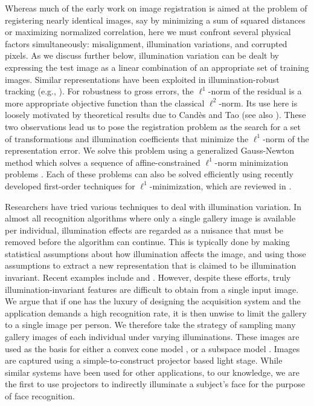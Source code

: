 \documentclass[10pt,journal,letterpaper,compsoc]{IEEEtran} %
\begin{document}
Whereas much of the early work on image registration is aimed at the
problem of registering nearly identical images, say by minimizing a sum of
squared distances or maximizing normalized correlation, here we must confront several physical factors
simultaneously: misalignment, illumination variations, and corrupted pixels.
As we discuss further below, illumination variation can be dealt by
expressing the test image as a linear combination of an appropriate set of
training images. Similar representations have been exploited in
illumination-robust tracking (e.g., \cite{Belhumeur1999-PAA,Murase1995-IJCV}).
For robustness to gross errors, the $\ell^1$-norm of the residual is a more
appropriate objective function than the classical $\ell^2$-norm. Its use here
is loosely motivated by theoretical results due to Cand\`{e}s and Tao
\cite{CandesE2005-IT} (see also \cite{Wright2008-IT}). These two observations
lead us to pose the registration problem as the search for a set of
transformations and illumination coefficients that minimize the $\ell^1$-norm
of the representation error. We solve this problem using a generalized
Gauss-Newton method which solves a sequence of affine-constrained $\ell^1$-norm
minimization problems \cite{Osborne1990-JAMSSB,Jittorntrum1980-NM}. Each of
these problems can also be solved efficiently using recently developed
first-order techniques for $\ell^1$-minimization, which are reviewed in
\cite{YangA2010-pp}.

Researchers have tried various techniques to deal with illumination variation.
In almost all recognition algorithms where only a single gallery image is
available per individual, illumination effects are regarded as a nuisance that
must be removed before the algorithm can continue.  This is typically done by
making statistical assumptions about how illumination affects the image, and
using those assumptions to extract a new representation that is claimed to be
illumination invariant.  Recent examples include \cite{chen2006total} and
\cite{zhou2007appearance}.  However, despite these efforts, truly
illumination-invariant features are difficult to obtain from a single input
image.  We argue that if one has the luxury of designing the acquisition system
and the application demands a high recognition rate,
it is then unwise to limit the gallery to a
single image per person.  We therefore take the strategy of sampling many
gallery images of each individual under varying illuminations.  These images
are used as the basis for either a convex cone model
\cite{Georghiades2001-PAMI,belhumeur1998set}, or a subspace model
\cite{Basri2003-PAMI}.  Images are captured using a simple-to-construct
projector based light stage.  While similar systems have been used for
other applications, to our knowledge, we
are the first to use projectors to indirectly illuminate a subject's face for
the purpose of face recognition.
\end{document}

